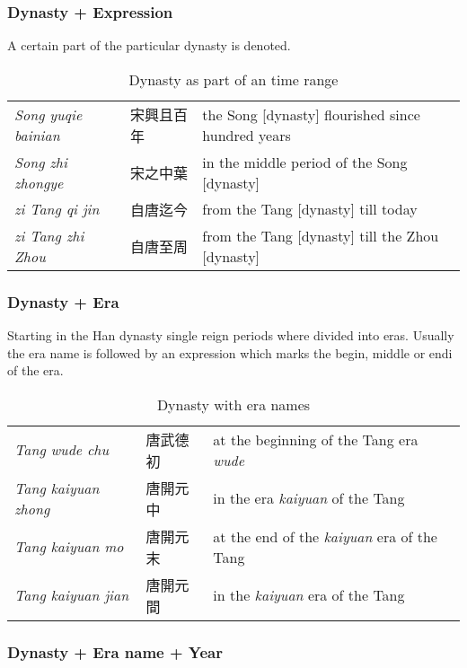 \documentclass[12pt, draft]{article}
\begin{document}
\subsubsection{Dynasty + Expression}
A certain part of the particular dynasty is denoted.

{\footnotesize
\begin{table}[h]
\caption{Dynasty as part of an time range}
\begin{tabular}{lll}
\emph{Song yuqie bainian} & 宋興且百年 & the Song [dynasty] flourished since hundred years \\
\emph{Song zhi zhongye} & 宋之中葉 & in the middle period of the Song [dynasty] \\
\emph{zi Tang qi jin} & 自唐迄今 & from the Tang [dynasty] till today \\
\emph{zi Tang zhi Zhou} & 自唐至周 & from the Tang [dynasty] till the Zhou [dynasty] \\
\end{tabular}
\end{table}
}

\subsubsection{Dynasty + Era}

Starting in the Han dynasty single reign periods where divided
into eras.  Usually the era name is followed by an expression
which marks the begin, middle or endi of the era.

{\footnotesize
\begin{table}[h]
\caption{Dynasty with era names}
\begin{tabular}{lll}
\hline
\emph{Tang wude chu} & 唐武德初 & at the beginning of the Tang era \emph{wude} \\
\emph{Tang kaiyuan zhong } & 唐開元中 & in the era \emph{kaiyuan} of the Tang \\
\emph{Tang kaiyuan mo} & 唐開元末 & at the end of the \emph{kaiyuan} era of the Tang \\
\emph{Tang kaiyuan jian} & 唐開元間 & in the \emph{kaiyuan} era of the Tang \\
\end{tabular}
\end{table}
}

\subsubsection{Dynasty + Era name + Year}
\end{document}
